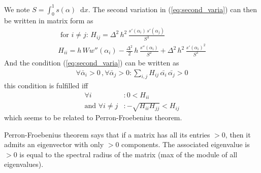 \documentclass[final,3p,times,authoryear]{elsarticle}
\renewcommand*\d{\mathop{}\!\mathrm{d}} %
\begin{document}
We note $S=\int_0^1 s(\alpha) \d x$. The second variation in (\ref{eq:second_varia}) can then be written in matrix form as
\begin{subequations}
\begin{align}
\label{eq:second_varia_discrete}
\text{ for } i \neq j: \, H_{ij} = \Delta^2 \, h^2 \,  \frac{s'(\alpha_i) \, s'(\alpha_j)}{S^3} \\
%
H_{ii} = h\, W w''(\alpha_i) - \frac{\Delta^2}{2} \, h \,  \frac{s''(\alpha_i)}{S^2}  + \Delta^2 \, h^2 \,  \frac{s'(\alpha_i)^2}{S^3}
\end{align}
\end{subequations}
And the condition (\ref{eq:second_varia}) can be written as
\begin{align}
\label{eq:cond_second_varia_discrete}
\forall  \bar{\alpha}_i >0 \, , \forall  \bar{\alpha}_j >0  : \sum_{i,j} H_{ij} \, \bar{\alpha_i} \, \bar{{\alpha_j}} >0
\end{align}
this condition is fulfilled iff 
\begin{subequations}
\begin{align}
\label{eq:cond_second_varia_discrete_bis}
\forall  i  &:  0 < H_{ii}  \\
\text{and } \forall  i \neq j  &:  - \sqrt{H_{ii} H_{jj} } < H_{ij}
\end{align}
\end{subequations}
which seems to be related to Perron-Froebenius theorem.

Perron-Froebenius theorem says that if a matrix has all its entries $>0$, then it admits an eigenvector with only $>0$ components. The associated eigenvalue is $>0$ is equal to the spectral radius of the matrix (max of the module of all eigenvalues).




%
%
%
%
%
%
%
%
%





\end{document}
